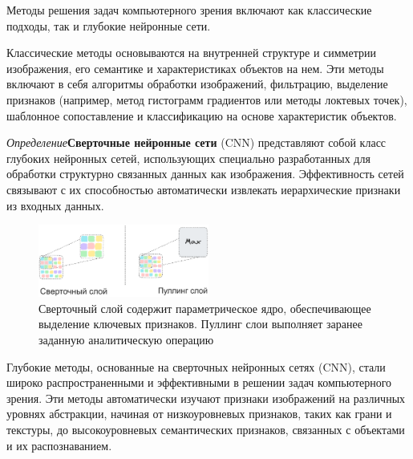 
Методы решения задач компьютерного зрения включают как классические подходы, так и глубокие нейронные сети.

Классические методы основываются на внутренней структуре и симметрии изображения, 
его семантике и характеристиках объектов на нем. 
Эти методы включают в себя алгоритмы обработки изображений,
 фильтрацию, выделение признаков (например, метод гистограмм градиентов или методы локтевых точек),
  шаблонное сопоставление и классификацию на основе характеристик объектов.

\textit{Определение}\textbf{Сверточные нейронные сети} (CNN)\cite{lecun1989handwritten} представляют собой класс глубоких нейронных сетей,
использующих
специально разработанных для обработки структурно связанных данных как изображения. 
Эффективность сетей связывают с их способностью автоматически извлекать иерархические признаки из входных данных.


\begin{figure}[h]
    \centering
    \includegraphics[width=0.5\textwidth]{assets/ml/cv/conv.excalidraw.png}
    \caption{Сверточный слой содержит параметрическое ядро, обеспечивающее выделение ключевых признаков. Пуллинг слои выполняет заранее заданную аналитическую операцию}
    \label{cnn}
\end{figure}

Глубокие методы, основанные на сверточных нейронных сетях (CNN), 
стали широко распространенными и эффективными в решении задач компьютерного зрения. 
Эти методы автоматически изучают признаки изображений на различных уровнях абстракции, 
начиная от низкоуровневых признаков, таких как грани и текстуры, до высокоуровневых семантических признаков,
 связанных с объектами и их распознаванием. 
 
